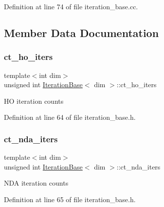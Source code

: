 Definition at line 74 of file iteration\+\_\+base.\+cc.



\subsection{Member Data Documentation}
\mbox{\label{class_iteration_base_afd007145fe5b7bfe22012c44c20d31a4}} 
\subsubsection{\texorpdfstring{ct\+\_\+ho\+\_\+iters}{ct\_ho\_iters}}
{\footnotesize\ttfamily template$<$int dim$>$ \\
unsigned int \hyperlink{class_iteration_base}{Iteration\+Base}$<$ dim $>$\+::ct\+\_\+ho\+\_\+iters\hspace{0.3cm}{\ttfamily [protected]}}

HO iteration counts 

Definition at line 64 of file iteration\+\_\+base.\+h.

\mbox{\label{class_iteration_base_a1b4bda01b55383e80b0631fbfc339385}} 
\subsubsection{\texorpdfstring{ct\+\_\+nda\+\_\+iters}{ct\_nda\_iters}}
{\footnotesize\ttfamily template$<$int dim$>$ \\
unsigned int \hyperlink{class_iteration_base}{Iteration\+Base}$<$ dim $>$\+::ct\+\_\+nda\+\_\+iters\hspace{0.3cm}{\ttfamily [protected]}}

N\+DA iteration counts 

Definition at line 65 of file iteration\+\_\+base.\+h.

\mbox{\label{class_iteration_base_a871d082ca148eb7976f591f99c2ce81b}} 
